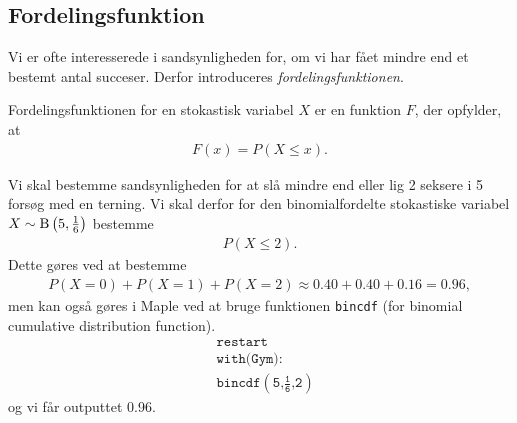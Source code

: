 \subsection*{Fordelingsfunktion}

Vi er ofte interesserede i sandsynligheden for, om vi har fået mindre end et bestemt antal succeser. Derfor introduceres \textit{fordelingsfunktionen}.
\begin{defn}[Fordelingsfunktion]
	Fordelingsfunktionen for en stokastisk variabel $X$ er en funktion $F$, der opfylder, at
	\begin{align*}
		F(x) = P(X \leq x).
	\end{align*}
\end{defn}

\begin{exa}
	Vi skal bestemme sandsynligheden for at slå mindre end eller lig 2 seksere i 5 forsøg med en terning. Vi skal derfor for den binomialfordelte stokastiske variabel $X \sim 		
	\textnormal{B}\left(5,\frac{1}{6}\right)$ bestemme
	\begin{align*}
		P(X \leq 2).
	\end{align*}
	Dette gøres ved at bestemme 
	\begin{align*}
		P(X = 0) + P(X = 1) + P(X = 2) \approx 0.40 + 0.40 + 0.16 = 0.96,
	\end{align*}
	men kan også gøres i Maple ved at bruge funktionen \texttt{bincdf} (for binomial cumulative distribution function).
	\begin{align*}
		&\texttt{restart}\\
		&\texttt{with(Gym):}\\
		&\texttt{bincdf$\left(\texttt{5,$\frac{\texttt{1}}{\texttt{6}}$,2}\right)$}
	\end{align*}
	og vi får outputtet 0.96.
\end{exa}


